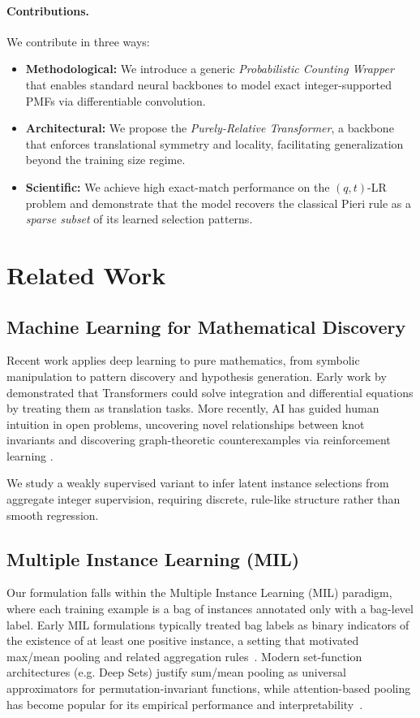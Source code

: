 \documentclass{article}
\theoremstyle{plain}
\theoremstyle{definition}
\theoremstyle{remark}
\begin{document}
	\paragraph{Contributions.} 
    We contribute in three ways:
	\begin{itemize}
		\item \textbf{Methodological:} We introduce a generic \textit{Probabilistic Counting Wrapper} that enables standard neural backbones to model exact integer-supported PMFs via differentiable convolution.
		\item \textbf{Architectural:} We propose the \textit{Purely-Relative Transformer}, a backbone that enforces translational symmetry and locality, facilitating generalization beyond the training size regime.
		\item \textbf{Scientific:} We achieve high exact-match performance on the $(q,t)$-LR problem and demonstrate that the model recovers the classical Pieri rule as a \textit{sparse subset} of its learned selection patterns.
	\end{itemize}
	
	\section{Related Work}
	\label{sec:related_work}
	
	\subsection{Machine Learning for Mathematical Discovery}
	Recent work applies deep learning to pure mathematics, from symbolic manipulation to pattern discovery and hypothesis generation. Early work by \cite{Lample2020Deep} demonstrated that Transformers could solve integration and differential equations by treating them as translation tasks.
    More recently, AI has guided human intuition in open problems, uncovering novel relationships between knot invariants \cite{davies2021advancing} and discovering graph-theoretic counterexamples via reinforcement learning \cite{wagner2021constructions}.

    We study a weakly supervised variant to infer latent instance selections from aggregate integer supervision, requiring discrete, rule-like structure rather than smooth regression.

	
    \subsection{Multiple Instance Learning (MIL)}
    Our formulation falls within the Multiple Instance Learning (MIL) paradigm, where each training example is a bag of instances annotated only with a bag-level label.
    Early MIL formulations typically treated bag labels as binary
    indicators of the existence of at least one positive instance, a setting that
    motivated max/mean pooling and related aggregation rules~\cite{dietterich1997solving,maron1998multiple}.
    Modern set-function architectures (e.g. Deep Sets) justify sum/mean pooling as 
    universal approximators for permutation-invariant functions, while attention-based 
    pooling has become popular for its empirical performance and interpretability~\cite{zaheer2017deep,ilse2018attention}.
    
\end{document}
